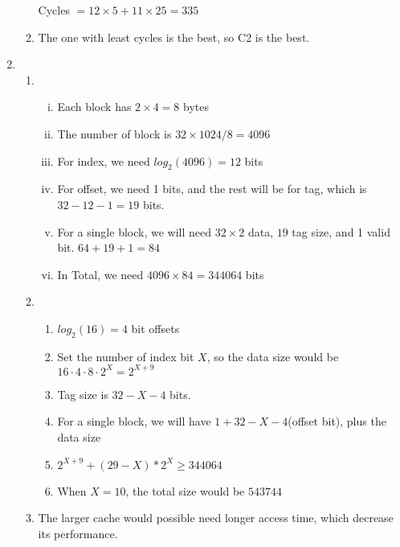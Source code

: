 \documentclass{article}
\def\math#1{$#1$}
\begin{document}
\begin{enumerate}[1)]
\begin{enumerate}[\text{C}1)]
\begin{center}
\begin{tabular}{ |c|c|c|c|c|c| }
             \hline
            \end{tabular}
        \end{center}
        Cycles \math{ = 12 \times 5 + 11 \times 25 = 335}
        \item The one with least cycles is the best, so C2 is the best.
        \end{enumerate}
    \item 
        \begin{enumerate}[1)]
            \item 
                 \begin{enumerate}[i)]
                    \item Each block has \math{2 \times 4 = 8} bytes
                    \item The number of block is \math{32 \times 1024 / 8 = 4096}
                    \item For index, we need \math{log_2(4096) = 12} bits
                    \item For offset, we need 1 bits, and the rest will be for tag, which is \math{32 - 12 - 1 = 19} bits.
                    \item For a single block, we will need \math{32 \times 2} data, \math{19} tag size, and 1 valid bit. \math{64 + 19 + 1 = 84}
                    \item In Total, we need \math{4096 \times 84 = 344064} bits
                \end{enumerate}
            \item 
                \begin{enumerate}
                    \item \math{log_2(16) = 4} bit offsets
                    \item Set the number of index bit \math{X}, so the data size would be \math{16 \cdot 4 \cdot 8 \cdot 2^X = 2^{X + 9}}
                    \item Tag size is \math{32 - X - 4} bits.
                    \item For a single block, we will have \math{1 + 32 - X - 4}(offset bit), plus the data size
                    \item \math{2^{X + 9} + (29 - X) * 2^{X} \geq 344064}
                    \item When \math{X = 10}, the total size would be \math{543744}
                \end{enumerate}
            \item The larger cache would possible need longer access time, which decrease its performance.

\end{enumerate}
\end{enumerate}
\end{document}
